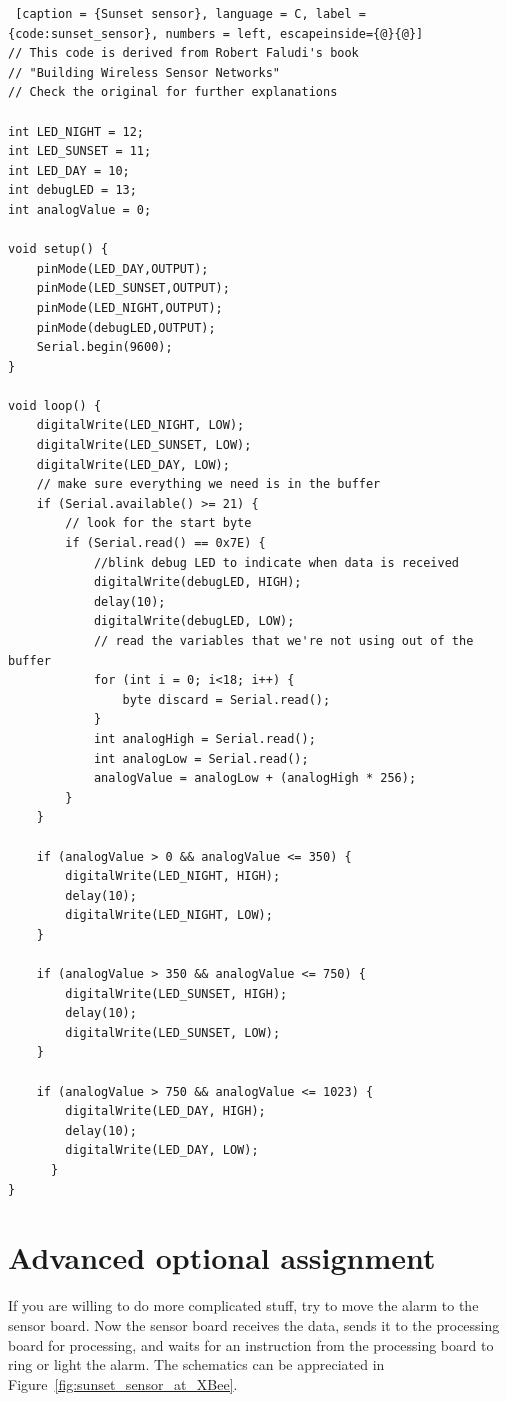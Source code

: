 \begin{lstlisting} [caption = {Sunset sensor}, language = C, label = {code:sunset_sensor}, numbers = left, escapeinside={@}{@}]
// This code is derived from Robert Faludi's book
// "Building Wireless Sensor Networks"
// Check the original for further explanations

int LED_NIGHT = 12;
int LED_SUNSET = 11;
int LED_DAY = 10;
int debugLED = 13;
int analogValue = 0;

void setup() {
    pinMode(LED_DAY,OUTPUT);
    pinMode(LED_SUNSET,OUTPUT);
    pinMode(LED_NIGHT,OUTPUT);
    pinMode(debugLED,OUTPUT);
    Serial.begin(9600);
}

void loop() {
    digitalWrite(LED_NIGHT, LOW);
    digitalWrite(LED_SUNSET, LOW);
    digitalWrite(LED_DAY, LOW);
    // make sure everything we need is in the buffer
    if (Serial.available() >= 21) {
        // look for the start byte
        if (Serial.read() == 0x7E) {
            //blink debug LED to indicate when data is received
            digitalWrite(debugLED, HIGH);
            delay(10);
            digitalWrite(debugLED, LOW);
            // read the variables that we're not using out of the buffer
            for (int i = 0; i<18; i++) {
                byte discard = Serial.read();
            }
            int analogHigh = Serial.read();
            int analogLow = Serial.read();
            analogValue = analogLow + (analogHigh * 256);
        }
    }

    if (analogValue > 0 && analogValue <= 350) {
        digitalWrite(LED_NIGHT, HIGH);
        delay(10);
        digitalWrite(LED_NIGHT, LOW);
    }

    if (analogValue > 350 && analogValue <= 750) {
        digitalWrite(LED_SUNSET, HIGH);
        delay(10);
        digitalWrite(LED_SUNSET, LOW);
    }

    if (analogValue > 750 && analogValue <= 1023) {
        digitalWrite(LED_DAY, HIGH);
        delay(10);
        digitalWrite(LED_DAY, LOW);
      }
}
\end{lstlisting}


\section{Advanced optional assignment}

If you are willing to do more complicated stuff, try to move the alarm to the sensor board. 
Now the sensor board receives the data, sends it to the processing board for processing, and waits for an instruction from the processing board to ring or light the alarm. The schematics can be appreciated in Figure~\ref{fig:sunset_sensor_at_XBee}.

